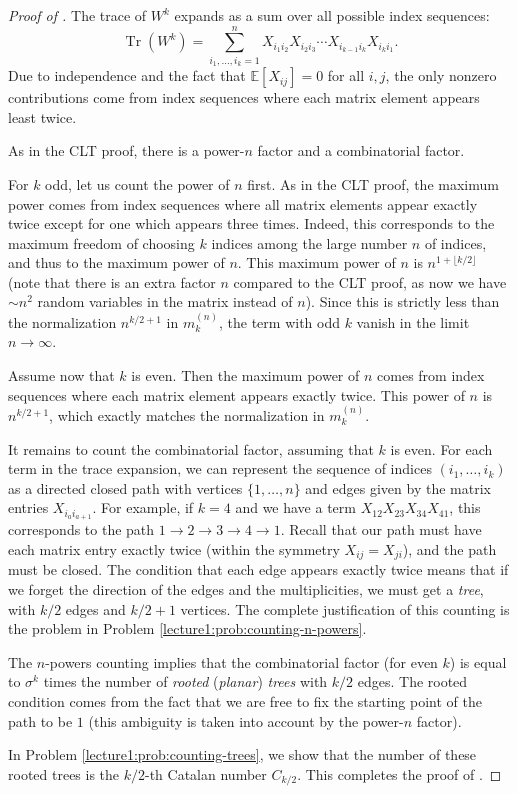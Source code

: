 \documentclass[letterpaper,11pt,oneside,reqno]{book}
\numberwithin{equation}{chapter}  %
\theoremstyle{definition}
\begin{document}
\begin{proof}[Proof of ]
	The trace of $W^k$ expands as a sum over all possible index sequences:
	\begin{equation}
		\operatorname{Tr}(W^k) = \sum_{i_1,\ldots,i_k=1}^n X_{i_1i_2}X_{i_2i_3}\cdots X_{i_{k-1}i_k}X_{i_ki_1}.
	\end{equation}
	Due to independence and the fact that
	$\mathbb{E}[X_{ij}]=0$ for all $i,j$, the only nonzero
	contributions come from index sequences
	where each matrix element appears least twice.

	As in the CLT proof, there is a power-$n$ factor and a combinatorial factor.

	For $k$ odd, let us count the power of $n$ first. As
	in the CLT proof, the
	maximum power comes from index sequences where all matrix
	elements appear exactly twice except for one which appears
	three times. Indeed, this corresponds to the maximum
	freedom of choosing $k$ indices among the large number $n$
	of indices, and thus to the maximum power of $n$.
	This maximum power of $n$ is $n^{1+\lfloor k/2 \rfloor }$
	(note that there is an extra factor $n$ compared to the CLT proof,
	as now we have $\sim n^2$ random variables in the matrix instead of $n$).
	Since this is strictly less than the
	normalization $n^{k/2+1}$ in $m_k^{(n)}$, the term with odd $k$
	vanish in the limit $n\to\infty$.

	Assume now that $k$ is even.
	Then the maximum power of $n$ comes from index sequences where each matrix element appears exactly twice.
	This power of $n$ is $n^{k/2+1}$, which exactly
	matches the normalization in $m_k^{(n)}$.

	It remains to count the combinatorial factor,
	assuming that $k$ is even.
	For each term in the trace expansion, we can represent the sequence of indices $(i_1,\ldots,i_k)$ as a directed closed path with vertices $\{1,\ldots,n\}$ and edges given by the matrix entries $X_{i_ai_{a+1}}$. For example, if $k=4$ and we have a term $X_{12}X_{23}X_{34}X_{41}$, this corresponds to the path $1\to 2\to 3\to 4\to 1$. Recall that our path must have each
	matrix entry exactly twice (within the symmetry $X_{ij}=X_{ji}$),
	and the path must be closed.
	The condition that each edge appears exactly twice
	means that if we forget the direction of the edges and the multiplicities,
	we must get a \emph{tree}, with $k/2$ edges and $k/2+1$ vertices.
	The complete justification of this counting is the
	problem in Problem \ref{lecture1:prob:counting-n-powers}.

	The $n$-powers counting implies that the combinatorial
	factor (for even $k$)
	is equal to $\sigma^k$ times the
	number of \emph{rooted} (\emph{planar}) \emph{trees} with $k/2$ edges.
	The rooted condition comes from the fact that
	we are free to fix the starting point of the path
	to be $1$ (this ambiguity is taken into account by the
	power-$n$ factor).

	In Problem \ref{lecture1:prob:counting-trees}, we show that the number of these rooted trees is the $k/2$-th Catalan number $C_{k/2}$.
	This completes the proof of .
\end{proof}
\end{document}
